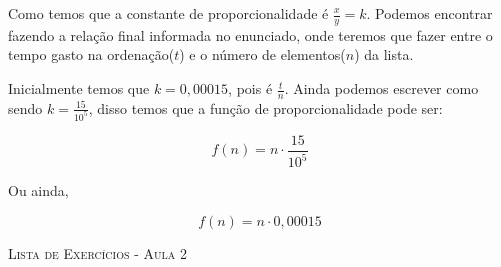 \documentclass{scrartcl} %
\newcommand{\titulo}[1]{%
\begin{center}
    {\LARGE {\scshape #1}}
\end{center}
}
\newcounter{Exer}
\theoremstyle{geral}
\newcommand{\titulo}[1]{%
\begin{center}
    {\LARGE {\scshape #1}}
\end{center}
}
\begin{document}
\begin{multicols}{2}
\begin{question}
Como temos que a constante de proporcionalidade é \(\frac{x}{y} = k\). Podemos encontrar fazendo a relação final informada no enunciado, onde teremos que fazer entre o tempo gasto na ordenação(\(t\)) e o número de elementos(\(n\)) da lista.\par
Inicialmente temos que \(k = 0,00015\), pois  é \(\frac{t}{n}\). Ainda podemos escrever como sendo \(k = \frac{15}{10^5}\), disso temos que a função de proporcionalidade pode ser:

\[f(n) = n \cdot \frac{15}{10^5}\]

Ou ainda,

\[f(n) = n \cdot 0,00015\]

\end{question}
\end{multicols}

\newpage
\titulo{Lista de Exercícios - Aula 2}


\end{document}
